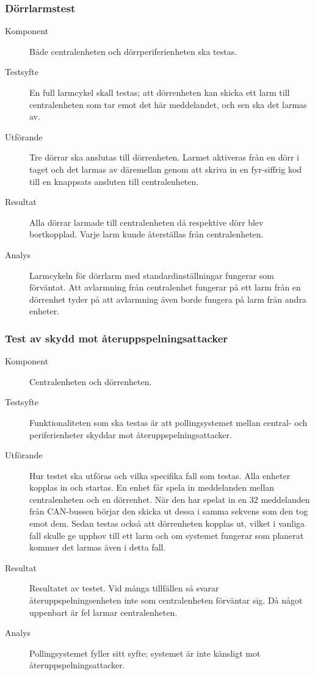 \documentclass[a4paper]{article}
\begin{document}
\subsubsection{Dörrlarmstest}
\begin{description}
\item[Komponent] Både centralenheten och dörrperiferienheten ska testas.

\item[Testsyfte] En full larmcykel skall testas; att dörrenheten kan skicka ett larm till centralenheten som tar emot det här meddelandet, och sen ska det larmas av.

\item[Utförande] Tre dörrar ska anslutas till dörrenheten. Larmet aktiveras från en dörr i taget och det larmas av däremellan genom att skriva in en fyr-siffrig kod till en knappsats ansluten till centralenheten.

\item[Resultat] Alla dörrar larmade till centralenheten då respektive dörr blev bortkopplad. Varje larm kunde återställas från centralenheten.

\item[Analys] Larmcykeln för dörrlarm med standardinställningar fungerar som förväntat.
Att avlarmning från centralenhet fungerar på ett larm från en dörrenhet tyder på att avlarmning även borde fungera på larm från andra enheter.
\end{description}

\subsubsection{Test av skydd mot återuppspelningsattacker}
\begin{description}
\item[Komponent] Centralenheten och dörrenheten.

\item[Testsyfte] Funktionaliteten som ska testas är att pollingsystemet mellan central- och periferienheter skyddar mot återuppspelningsattacker.

\item[Utförande] Hur testet ska utföras och vilka specifika fall som testas.
Alla enheter kopplas in och startas.
En enhet får spela in meddelanden mellan centralenheten och en dörrenhet.
När den har spelat in en 32 meddelanden från CAN-bussen börjar den skicka ut dessa i samma sekvens som den tog emot dem.
Sedan testas också att dörrenheten kopplas ut, vilket i vanliga fall skulle ge upphov till ett larm och om systemet fungerar som planerat kommer det larmas även i detta fall.

\item[Resultat] Resultatet av testet. Vid många tillfällen så svarar återuppspelningsenheten inte som centralenheten förväntar sig.
Då något uppenbart är fel larmar centralenheten.

\item[Analys] Pollingsystemet fyller sitt syfte; systemet är inte känsligt mot återuppspelningsattacker.
\end{description}
\end{document}
